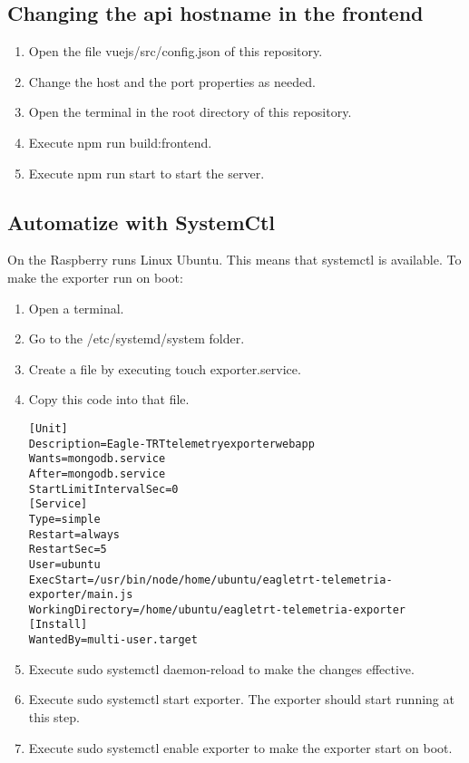 \subsection{Changing the api hostname in the frontend}
\begin{enumerate}
    \item Open the file vuejs/src/config.json of this repository.
    \item Change the host and the port properties as needed.
    \item Open the terminal in the root directory of this repository.
    \item Execute npm run build:frontend.
    \item Execute npm run start to start the server.
\end{enumerate}

\subsection{Automatize with SystemCtl}
On the Raspberry runs Linux Ubuntu. This means that systemctl is available.
To make the exporter run on boot:
\begin{enumerate}
    \item Open a terminal.
    \item Go to the /etc/systemd/system folder.
    \item Create a file by executing touch exporter.service.
    \item Copy this code into that file.
        \begin{alltt}
            [Unit]
            Description=Eagle-TRT telemetry exporter webapp
            Wants=mongodb.service
            After=mongodb.service
            StartLimitIntervalSec=0
            [Service]
            Type=simple
            Restart=always
            RestartSec=5
            User=ubuntu
            ExecStart=/usr/bin/node /home/ubuntu/eagletrt-telemetria-exporter/main.js
            WorkingDirectory=/home/ubuntu/eagletrt-telemetria-exporter
            [Install]
            WantedBy=multi-user.target
        \end{alltt}
    \item Execute sudo systemctl daemon-reload to make the changes effective.
    \item Execute sudo systemctl start exporter. The exporter should start running at this step.
    \item Execute sudo systemctl enable exporter to make the exporter start on boot.
\end{enumerate}